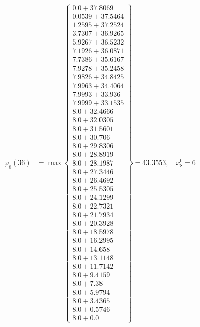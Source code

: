 \documentclass{article}
\begin{document}
\begin{align*}
  
\varphi_{8}(36) &= \max \left\{ \begin{array}{c}
0.0 + 37.8069 \\
 0.0539 + 37.5464 \\
 1.2595 + 37.2524 \\
 3.7307 + 36.9265 \\
 5.9267 + 36.5232 \\
 7.1926 + 36.0871 \\
 7.7386 + 35.6167 \\
 7.9278 + 35.2458 \\
 7.9826 + 34.8425 \\
 7.9963 + 34.4064 \\
 7.9993 + 33.936 \\
 7.9999 + 33.1535 \\
 8.0 + 32.4666 \\
 8.0 + 32.0305 \\
 8.0 + 31.5601 \\
 8.0 + 30.706 \\
 8.0 + 29.8306 \\
 8.0 + 28.8919 \\
 8.0 + 28.1987 \\
 8.0 + 27.3446 \\
 8.0 + 26.4692 \\
 8.0 + 25.5305 \\
 8.0 + 24.1299 \\
 8.0 + 22.7321 \\
 8.0 + 21.7934 \\
 8.0 + 20.3928 \\
 8.0 + 18.5978 \\
 8.0 + 16.2995 \\
 8.0 + 14.658 \\
 8.0 + 13.1148 \\
 8.0 + 11.7142 \\
 8.0 + 9.4159 \\
 8.0 + 7.38 \\
 8.0 + 5.9794 \\
 8.0 + 3.4365 \\
 8.0 + 0.5746 \\
 8.0 + 0.0
\end{array} \right\}=43.3553,\quad x_{8}^0=6\\
  
  
\end{align*}
\end{document}
